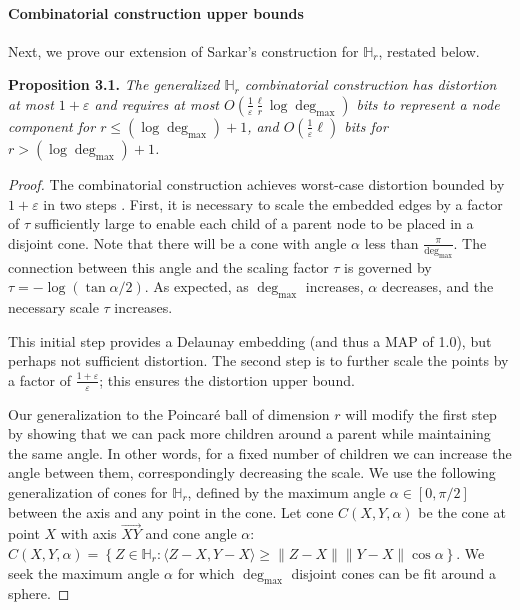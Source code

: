 \paragraph{Combinatorial construction upper bounds}

Next, we prove our extension of Sarkar's construction for $\mathbb{H}_r$, restated below.
 
{\bf Proposition 3.1.} \textit{The generalized $\mathbb{H}_r$ combinatorial construction has distortion at most $1+\varepsilon$ and requires at most $O(\frac{1}{\varepsilon}\frac{\ell}{r} \log \operatorname{deg}_{\max})$ bits to represent a node component for $r \leq (\log \operatorname{deg}_{\max})+1$, and $O(\frac{1}{\varepsilon}\ell)$ bits for $r > (\log \operatorname{deg}_{\max})+1$.}

\begin{proof}

The combinatorial construction achieves worst-case distortion bounded by $1+\varepsilon$ in two steps \cite{sarkar}.
First, it is necessary to scale the embedded edges by a factor of $\tau$ sufficiently large to enable each child of a parent node to be placed in a disjoint cone.
Note that there will be a cone with angle $\alpha$ less than $\frac{\pi}{\operatorname{deg}_{\max}}$.
The connection between this angle and the scaling factor $\tau$ is governed by $\tau = -\log( \tan \alpha/2)$.
As expected, as $\operatorname{deg}_{\max}$ increases, $\alpha$ decreases, and the necessary scale $\tau$ increases.

This initial step provides a Delaunay embedding (and thus a MAP of 1.0), but perhaps not sufficient distortion.
The second step is to further scale the points by a factor of $\frac{1+\varepsilon}{\varepsilon}$; this ensures the distortion upper bound. 

Our generalization to the Poincar\'{e} ball of dimension $r$ will modify the first step by showing that we can pack more children around a parent while maintaining the same angle.
In other words, for a fixed number of children we can increase the angle between them, correspondingly decreasing the scale.
We use the following generalization of cones for $\mathbb{H}_r$, defined by the maximum angle $\alpha \in [0,\pi/2]$ between the axis and any point in the cone.
Let cone $C(X,Y, \alpha)$ be the cone at point $X$ with axis $\vec{XY}$ and cone angle $\alpha$: $C(X,Y, \alpha) = \left\{ Z \in \mathbb{H}_{r} : \langle Z - X, Y - X \rangle \geq  \|Z-X\|\|Y-X\| \cos {\alpha} \right\}.$
We seek the maximum angle $\alpha$ for which $\operatorname{deg}_{\max}$ disjoint cones can be fit around a sphere.


\end{proof}
